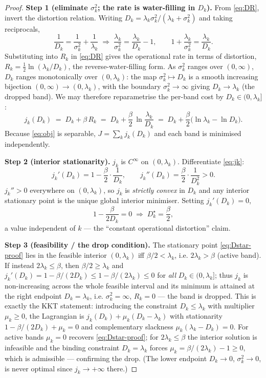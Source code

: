\begin{proof}
\textbf{Step 1 (eliminate $\sigma_k^2$; the rate is water-filling in $D_k$).}
From \eqref{eq:DR}, invert the distortion relation. Writing $D_k=\lambda_k\sigma_k^2/(\lambda_k+\sigma_k^2)$ and taking reciprocals,
\[
\frac{1}{D_k}=\frac{1}{\sigma_k^2}+\frac{1}{\lambda_k}
\;\Longrightarrow\;
\frac{\lambda_k}{\sigma_k^2}=\frac{\lambda_k}{D_k}-1,
\qquad
1+\frac{\lambda_k}{\sigma_k^2}=\frac{\lambda_k}{D_k}.
\]
Substituting into $R_k$ in \eqref{eq:DR} gives the operational rate in terms of
distortion, $R_k=\tfrac12\ln(\lambda_k/D_k)$, the reverse-water-filling form.
As $\sigma_k^2$ ranges over $(0,\infty)$, $D_k$ ranges monotonically over
$(0,\lambda_k)$: the map $\sigma_k^2\mapsto D_k$ is a smooth increasing bijection
$(0,\infty)\to(0,\lambda_k)$, with the boundary $\sigma_k^2\to\infty$ giving
$D_k\to\lambda_k$ (the dropped band). We may therefore reparametrise the
per-band cost by $D_k\in(0,\lambda_k]$:
\begin{equation}
j_k(D_k)\;=\;D_k+\beta\,R_k
\;=\;D_k+\frac{\beta}{2}\,\ln\!\frac{\lambda_k}{D_k}
\;=\;D_k+\frac{\beta}{2}\bigl(\ln\lambda_k-\ln D_k\bigr).
\label{eq:jk}
\end{equation}
Because \eqref{eq:obj} is separable, $J=\sum_k j_k(D_k)$ and each band is
minimised independently.

\textbf{Step 2 (interior stationarity).}
$j_k$ is $C^\infty$ on $(0,\lambda_k)$. Differentiate \eqref{eq:jk}:
\[
j_k'(D_k)=1-\frac{\beta}{2}\cdot\frac{1}{D_k},
\qquad
j_k''(D_k)=\frac{\beta}{2}\cdot\frac{1}{D_k^{2}}>0 .
\]
$j_k''>0$ everywhere on $(0,\lambda_k)$, so $j_k$ is \emph{strictly convex} in
$D_k$ and any interior stationary point is the unique global interior minimiser.
Setting $j_k'(D_k)=0$,
\begin{equation}
1-\frac{\beta}{2D_k}=0
\;\Longrightarrow\;
D_k^\star=\frac{\beta}{2},
\label{eq:Dstar-proof}
\end{equation}
a value independent of $k$ --- the ``constant operational distortion'' claim.

\textbf{Step 3 (feasibility / the drop condition).}
The stationary point \eqref{eq:Dstar-proof} lies in the feasible interior
$(0,\lambda_k)$ iff $\beta/2<\lambda_k$, i.e. $2\lambda_k>\beta$ (active band).
If instead $2\lambda_k\le\beta$, then $\beta/2\ge\lambda_k$ and $j_k'(D_k)=1-\beta/(2D_k)\le 1-\beta/(2\lambda_k)\le 0$ for \emph{all} $D_k\in(0,\lambda_k]$;
thus $j_k$ is non-increasing across the whole feasible interval and its minimum
is attained at the right endpoint $D_k=\lambda_k$, i.e. $\sigma_k^2=\infty$,
$R_k=0$ --- the band is dropped. This is exactly the KKT statement: introducing
the constraint $D_k\le\lambda_k$ with multiplier $\mu_k\ge0$, the Lagrangian is
$j_k(D_k)+\mu_k(D_k-\lambda_k)$ with stationarity $1-\beta/(2D_k)+\mu_k=0$ and
complementary slackness $\mu_k(\lambda_k-D_k)=0$. For active bands $\mu_k=0$
recovers \eqref{eq:Dstar-proof}; for $2\lambda_k\le\beta$ the interior solution
is infeasible and the binding constraint $D_k=\lambda_k$ forces
$\mu_k=\beta/(2\lambda_k)-1\ge0$, which is admissible --- confirming the drop.
(The lower endpoint $D_k\to0$, $\sigma_k^2\to0$, is never optimal since
$j_k\to+\infty$ there.)


\end{proof}
